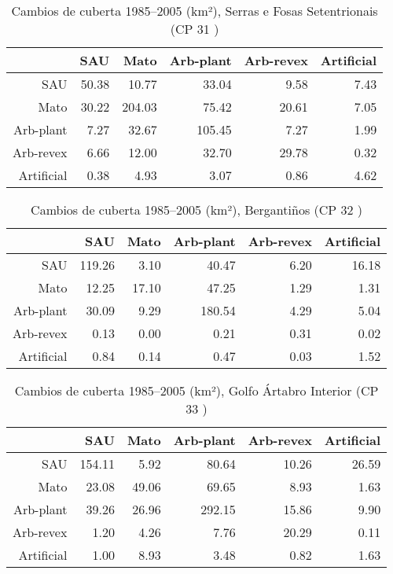 \begin{table}[p]
\centering
\caption{Cambios de cuberta 1985--2005 (km²), Serras e Fosas Setentrionais (CP 31 )} 
\label{TaboaContinxCP31}
\begin{tabular}{rrrrrr}
  \hline
 & SAU & Mato & Arb-plant & Arb-revex & Artificial \\ 
  \hline
SAU & 50.38 & 10.77 & 33.04 & 9.58 & 7.43 \\ 
  Mato & 30.22 & 204.03 & 75.42 & 20.61 & 7.05 \\ 
  Arb-plant & 7.27 & 32.67 & 105.45 & 7.27 & 1.99 \\ 
  Arb-revex & 6.66 & 12.00 & 32.70 & 29.78 & 0.32 \\ 
  Artificial & 0.38 & 4.93 & 3.07 & 0.86 & 4.62 \\ 
   \hline
\end{tabular}
\end{table}
\begin{table}[p]
\centering
\caption{Cambios de cuberta 1985--2005 (km²), Bergantiños (CP 32 )} 
\label{TaboaContinxCP32}
\begin{tabular}{rrrrrr}
  \hline
 & SAU & Mato & Arb-plant & Arb-revex & Artificial \\ 
  \hline
SAU & 119.26 & 3.10 & 40.47 & 6.20 & 16.18 \\ 
  Mato & 12.25 & 17.10 & 47.25 & 1.29 & 1.31 \\ 
  Arb-plant & 30.09 & 9.29 & 180.54 & 4.29 & 5.04 \\ 
  Arb-revex & 0.13 & 0.00 & 0.21 & 0.31 & 0.02 \\ 
  Artificial & 0.84 & 0.14 & 0.47 & 0.03 & 1.52 \\ 
   \hline
\end{tabular}
\end{table}
\begin{table}[p]
\centering
\caption{Cambios de cuberta 1985--2005 (km²), Golfo Ártabro Interior (CP 33 )} 
\label{TaboaContinxCP33}
\begin{tabular}{rrrrrr}
  \hline
 & SAU & Mato & Arb-plant & Arb-revex & Artificial \\ 
  \hline
SAU & 154.11 & 5.92 & 80.64 & 10.26 & 26.59 \\ 
  Mato & 23.08 & 49.06 & 69.65 & 8.93 & 1.63 \\ 
  Arb-plant & 39.26 & 26.96 & 292.15 & 15.86 & 9.90 \\ 
  Arb-revex & 1.20 & 4.26 & 7.76 & 20.29 & 0.11 \\ 
  Artificial & 1.00 & 8.93 & 3.48 & 0.82 & 1.63 \\ 
   \hline
\end{tabular}
\end{table}
